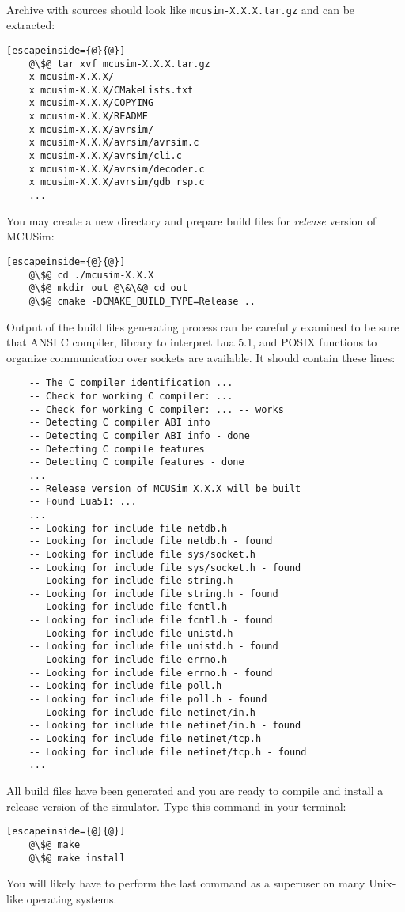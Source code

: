 \paragraph{}
Archive with sources
should look like \lstinline|mcusim-X.X.X.tar.gz| and can be extracted:
\begin{lstlisting}[escapeinside={@}{@}]
	@\$@ tar xvf mcusim-X.X.X.tar.gz
	x mcusim-X.X.X/
	x mcusim-X.X.X/CMakeLists.txt
	x mcusim-X.X.X/COPYING
	x mcusim-X.X.X/README
	x mcusim-X.X.X/avrsim/
	x mcusim-X.X.X/avrsim/avrsim.c
	x mcusim-X.X.X/avrsim/cli.c
	x mcusim-X.X.X/avrsim/decoder.c
	x mcusim-X.X.X/avrsim/gdb_rsp.c
	...
\end{lstlisting}
You may create a new directory and prepare build files for \emph{release}
version of MCUSim:
\begin{lstlisting}[escapeinside={@}{@}]
	@\$@ cd ./mcusim-X.X.X
	@\$@ mkdir out @\&\&@ cd out
	@\$@ cmake -DCMAKE_BUILD_TYPE=Release ..
\end{lstlisting}
Output of the build files generating process can be carefully examined to be
sure that ANSI C compiler, library to interpret Lua 5.1, and POSIX functions
to organize communication over sockets are available. It should contain these
lines:
\begin{lstlisting}
	-- The C compiler identification ...
	-- Check for working C compiler: ...
	-- Check for working C compiler: ... -- works
	-- Detecting C compiler ABI info
	-- Detecting C compiler ABI info - done
	-- Detecting C compile features
	-- Detecting C compile features - done
	...
	-- Release version of MCUSim X.X.X will be built
	-- Found Lua51: ...
	...
	-- Looking for include file netdb.h
	-- Looking for include file netdb.h - found
	-- Looking for include file sys/socket.h
	-- Looking for include file sys/socket.h - found
	-- Looking for include file string.h
	-- Looking for include file string.h - found
	-- Looking for include file fcntl.h
	-- Looking for include file fcntl.h - found
	-- Looking for include file unistd.h
	-- Looking for include file unistd.h - found
	-- Looking for include file errno.h
	-- Looking for include file errno.h - found
	-- Looking for include file poll.h
	-- Looking for include file poll.h - found
	-- Looking for include file netinet/in.h
	-- Looking for include file netinet/in.h - found
	-- Looking for include file netinet/tcp.h
	-- Looking for include file netinet/tcp.h - found
	...
\end{lstlisting}
All build files have been generated and you are ready to compile and install
a release version of the simulator. Type this command in your terminal:
\begin{lstlisting}[escapeinside={@}{@}]
	@\$@ make
	@\$@ make install
\end{lstlisting}
You will likely have to perform the last command as a superuser on many
Unix-like operating systems.
